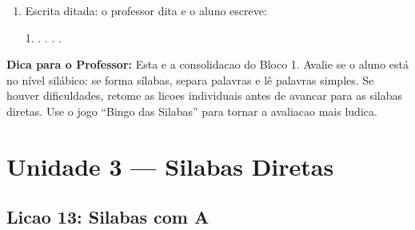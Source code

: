 \begin{exercicio}
\begin{enumerate}[resume]
  \item Escrita ditada: o professor dita e o aluno escreve:
  \begin{center}
  1. \underline{\hspace{4cm}} . \underline{\hspace{4cm}} . \underline{\hspace{4cm}} . \underline{\hspace{4cm}} . \underline{\hspace{4cm}}
  \end{center}
\end{enumerate}
\end{exercicio}

\begin{dica}
\textbf{Dica para o Professor:} Esta e a consolidacao do Bloco 1. Avalie se o aluno est\'a no n\'ivel sil\'abico: se forma s\'ilabas, separa palavras e l\^e palavras simples. Se houver dificuldades, retome as licoes individuais antes de avancar para as silabas diretas. Use o jogo ``Bingo das Silabas'' para tornar a avaliacao mais ludica.
\end{dica}



\chapter{Unidade 3 --- Silabas Diretas}

\section{Licao 13: Silabas com A}

\rotinasimples
{}



